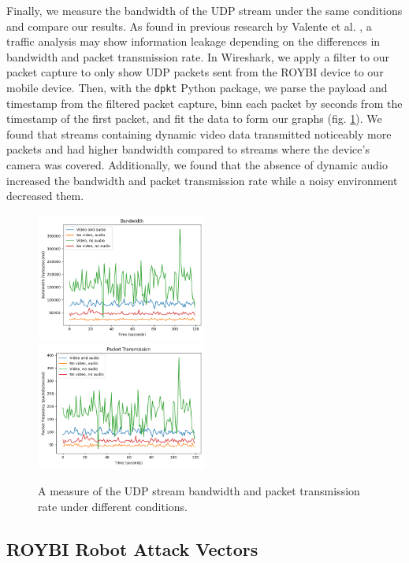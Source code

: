 \documentclass[12pt]{ucthesis}
\begin{document}
Finally, we measure the bandwidth of the UDP stream under the same conditions and compare our results. As found in previous research by Valente et al. \cite{valente}, a traffic analysis may show information leakage depending on the differences in bandwidth and packet transmission rate. In Wireshark, we apply a filter to our packet capture to only show UDP packets sent from the ROYBI device to our mobile device. Then, with the \texttt{dpkt} Python package, we parse the payload and timestamp from the filtered packet capture, binn each packet by seconds from the timestamp of the first packet, and fit the data to form our graphs (fig. \ref{fig:plots}). We found that streams containing dynamic video data transmitted noticeably more packets and had higher bandwidth compared to streams where the device's camera was covered. Additionally, we found that the absence of dynamic audio increased the bandwidth and packet transmission rate while a noisy environment decreased them.

\begin{figure}
    \includegraphics[width=0.5\textwidth]{bandwidth.png}
    \includegraphics[width=0.5\textwidth]{packettrans.png}
    \caption{A measure of the UDP stream bandwidth and packet transmission rate under different conditions.}
    \label{fig:plots}
\end{figure}

\subsection{ROYBI Robot Attack Vectors}
\end{document}
